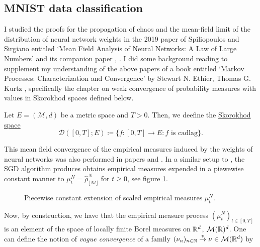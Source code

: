 \documentclass{article}
\begin{document}
\subsection{MNIST data classification}

I studied the proofs for the propagation of chaos and the mean-field limit of the distribution of neural network weights in the 2019 paper of Spiliopoulos and Sirgiano entitled ‘Mean Field Analysis of Neural Networks: A Law of Large Numbers’ and its companion paper \cite{sirignano2019meanfieldanalysislln}, \cite{sirignano2019meanfieldanalysisclt}. I did some background reading to supplement my understanding of the above papers of a book entitled ‘Markov Processes: Characterization and Convergence’ by Stewart N. Ethier, Thomas G. Kurtz \cite{ethier2009markov}, specifically the chapter on weak convergence of probability measures with values in Skorokhod spaces defined below.

\begin{boxdef}\label{def: skorokhod}
	Let $  E = (\mathcal{M}, d)$ be a metric space and $ T>0$. Then, we deefine the \underline{Skorokhod space} 
\begin{equation}
	\mathcal{D}([0,T]; E) \coloneqq \{f:[0,T]\to E: f \text{ is cadlag}\}.
\end{equation}

\end{boxdef}

This mean field convergence of the empirical measures induced by the weights of neural networks was also performed in papers \cite{sirignano2019meanfieldanalysisclt} and \cite{sirignano2019meanfieldanalysislln}. In a similar setup to \cite{Mei_2018}, the SGD algorithm produces obtains empirical measures expended in a piewewise constant manner to $\mu^{N}_{t} = \hat{\rho}^{N}_{\lfloor Nt \rfloor}$ for $ t\geq 0$, see figure \ref{fig: piecewise constant extension of function}. 
\begin{figure}[H]
    \centering
    
    \caption{Piecewise constant extension of scaled empirical measures $ \mu^{N}_{t}$.}
    \label{fig: piecewise constant extension of function}
\end{figure}

Now, by construction, we have that the empirical measure process $ (\mu^{N}_{t})_{t\in [0,T]}$ is an element of the space of locally finite Borel measures on $ \mathbb{R}^{d}$, $ \mathcal{M}(\mathbb{R})^{d}$. One can define the notion of \textit{vague convergence} of a family $ (\nu_{n})_{n\in \mathbb{N}} \stackrel{v}{\to} \nu\in \mathcal{M}(\mathbb{R}^{d})$ by 
\end{document}
